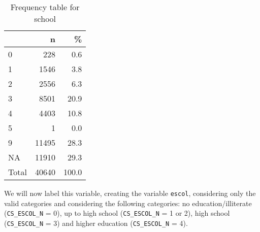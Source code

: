 \documentclass[
]{article}
\newenvironment{Shaded}{\begin{snugshade}}{\end{snugshade}}
\newcommand{\CommentTok}[1]{\textcolor[rgb]{0.56,0.35,0.01}{\textit{#1}}}
\newcommand{\DataTypeTok}[1]{\textcolor[rgb]{0.13,0.29,0.53}{#1}}
\newcommand{\DecValTok}[1]{\textcolor[rgb]{0.00,0.00,0.81}{#1}}
\newcommand{\KeywordTok}[1]{\textcolor[rgb]{0.13,0.29,0.53}{\textbf{#1}}}
\newcommand{\NormalTok}[1]{#1}
\newcommand{\OperatorTok}[1]{\textcolor[rgb]{0.81,0.36,0.00}{\textbf{#1}}}
\newcommand{\OtherTok}[1]{\textcolor[rgb]{0.56,0.35,0.01}{#1}}
\newcommand{\StringTok}[1]{\textcolor[rgb]{0.31,0.60,0.02}{#1}}
\begin{document}
\begin{table}[!h]

\caption{\label{tab:unnamed-chunk-26}Frequency table for school}
\centering
\begin{tabular}[t]{l|r|r}
\hline
  & n & \%\\
\hline
0 & 228 & 0.6\\
\hline
1 & 1546 & 3.8\\
\hline
2 & 2556 & 6.3\\
\hline
3 & 8501 & 20.9\\
\hline
4 & 4403 & 10.8\\
\hline
5 & 1 & 0.0\\
\hline
9 & 11495 & 28.3\\
\hline
NA & 11910 & 29.3\\
\hline
Total & 40640 & 100.0\\
\hline
\end{tabular}
\end{table}

We will now label this variable, creating the variable \texttt{escol},
considering only the valid categories and considering the following
categories: no education/illiterate (\texttt{CS\_ESCOL\_N} = 0), up to
high school (\texttt{CS\_ESCOL\_N} = 1 or 2), high school
(\texttt{CS\_ESCOL\_N} = 3) and higher education (\texttt{CS\_ESCOL\_N}
= 4).

\begin{Shaded}
\end{Shaded}

\begin{Shaded}
\end{Shaded}
\end{document}
